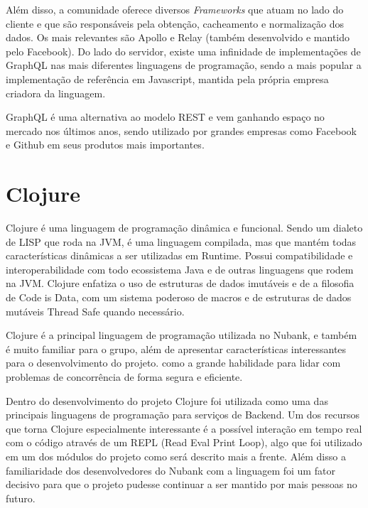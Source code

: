     Além disso, a comunidade oferece diversos \textit{Frameworks} que atuam no lado do cliente e que são responsáveis pela obtenção, cacheamento e normalização dos dados. Os mais relevantes são Apollo e Relay (também desenvolvido e mantido pelo Facebook). Do lado do servidor, existe uma infinidade de implementações de GraphQL nas mais diferentes linguagens de programação, sendo a mais popular a implementação de referência em Javascript, mantida pela própria empresa criadora da linguagem.
    
    GraphQL é uma alternativa ao modelo REST e vem ganhando espaço no mercado nos últimos anos, sendo utilizado por grandes empresas como Facebook e Github em seus produtos mais importantes.
    
    
    
	\section{Clojure}
	
	Clojure é uma linguagem de programação dinâmica e funcional. Sendo um dialeto de LISP que roda na JVM, é uma linguagem compilada, mas que mantém todas características dinâmicas a ser utilizadas em Runtime. Possui compatibilidade e interoperabilidade com todo ecossistema Java e de outras linguagens que rodem na JVM. Clojure enfatiza o uso de estruturas de dados imutáveis e de a filosofia de Code is Data, com um sistema poderoso de macros e de estruturas de dados mutáveis Thread Safe quando necessário. \cite{clojurerationale}
	
	Clojure é a principal linguagem de programação utilizada no Nubank, e também é muito familiar para o grupo, além de apresentar características interessantes para o desenvolvimento do projeto. como a grande habilidade para lidar com problemas de concorrência de forma segura e eficiente.
	
	Dentro do desenvolvimento do projeto Clojure foi utilizada como uma das principais linguagens de programação para serviços de Backend. Um dos recursos que torna Clojure especialmente interessante é a possível interação em tempo real com o código através de um REPL (Read Eval Print Loop), algo que foi utilizado em um dos módulos do projeto como será descrito mais a frente. Além disso a familiaridade dos desenvolvedores do Nubank com a linguagem foi um fator decisivo para que o projeto pudesse continuar a ser mantido por mais pessoas no futuro.
	
